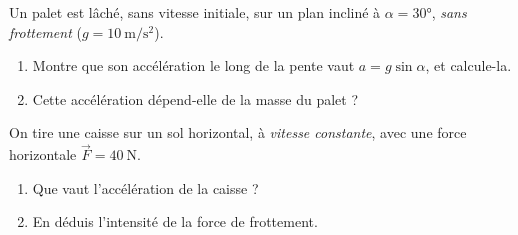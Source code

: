 \documentclass[11pt,a4paper]{article}
\newcommand{\vv}[1]{\vec{#1}}\newcommand{\ds}{\displaystyle}
\begin{document}
\begin{exo}
Un palet est lâché, sans vitesse initiale, sur un plan incliné à $\alpha=\ang{30}$, \emph{sans frottement}
($g=\qty{10}{\metre\per\second\squared}$).
\begin{enumerate}[label=\alph*)]
  \item Montre que son accélération le long de la pente vaut $a=g\sin\alpha$, et calcule-la.
  \item Cette accélération dépend-elle de la masse du palet ?
\end{enumerate}
\end{exo}

\begin{exo}
On tire une caisse sur un sol horizontal, à \emph{vitesse constante}, avec une force horizontale
$\vv F=\qty{40}{\newton}$.
\begin{enumerate}[label=\alph*)]
  \item Que vaut l'accélération de la caisse ?
  \item En déduis l'intensité de la force de frottement.
\end{enumerate}
\end{exo}
\end{document}
